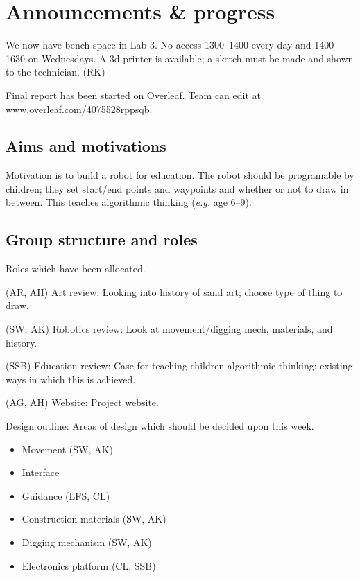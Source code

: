 \documentclass[a4paper,11pt,twoside,class=meetingmins,crop=false]{standalone}
\begin{document}
\section{Announcements \& progress}
\begin{items}
    \item We now have bench space in Lab  3. No access 1300--1400 every day and 1400--1630 on Wednesdays. A 3d printer is available; a sketch must be made and shown to the technician. (RK)
    \item Final report has been started on Overleaf. Team can edit at \url{www.overleaf.com/4075528rppsqb}.
\subsection{Aims and motivations}
    \item Motivation is to build a robot for education. The robot should be programable by children; they set start/end points and waypoints and whether or not to draw in between. This teaches algorithmic thinking (\emph{e.g.} age 6--9).
\subsection{Group structure and roles}
    \item Roles which have been allocated.
    \begin{hiddensubitems}
        \item[(AR, AH)] Art review: Looking into history of sand art; choose type of thing to draw.
        \item[(SW, AK)] Robotics review: Look at movement/digging mech, materials, and history.
        \item[(SSB)] Education review: Case for teaching children algorithmic thinking; existing ways in which this is achieved.
        \item[(AG, AH)] Website: Project website.
    \end{hiddensubitems}

    \item Design outline: Areas of design which should be decided upon this week.
    \begin{itemize}
        \item Movement (SW, AK)
        \item Interface
        \item Guidance (LFS, CL)
        \item Construction materials (SW, AK)
        \item Digging mechanism (SW, AK)
        \item Electronics platform (CL, SSB)
    \end{itemize}

\end{items}
\end{document}
